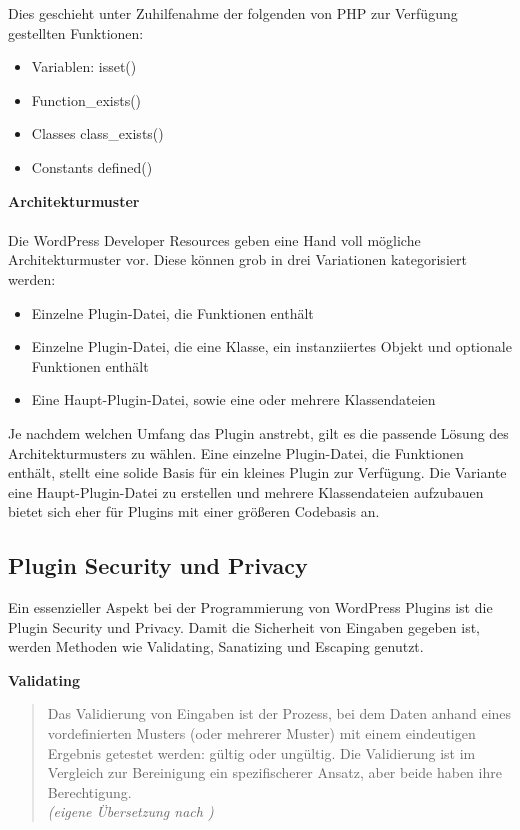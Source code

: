 Dies geschieht unter Zuhilfenahme der folgenden von PHP zur Verfügung gestellten Funktionen:
\begin{itemize}
 \item Variablen: isset()
 \item Function\_exists() %
 \item Classes class\_exists()
 \item Constants defined()
\end{itemize}
\vspace{1em}
\textbf{Architekturmuster}\\\\
Die WordPress Developer Resources geben eine Hand voll mögliche Architekturmuster vor.
Diese können grob in drei Variationen kategorisiert werden:
\begin{itemize}
 \item Einzelne Plugin-Datei, die Funktionen enthält
 \item Einzelne Plugin-Datei, die eine Klasse, ein instanziiertes Objekt und optionale Funktionen enthält
 \item Eine Haupt-Plugin-Datei, sowie eine oder mehrere Klassendateien
\end{itemize}

Je nachdem welchen Umfang das Plugin anstrebt, gilt es die passende Lösung des Architekturmusters zu wählen.
Eine einzelne Plugin-Datei, die Funktionen enthält, stellt eine solide Basis für ein kleines Plugin zur Verfügung.
Die Variante eine Haupt-Plugin-Datei zu erstellen und mehrere Klassendateien aufzubauen bietet sich eher für Plugins mit einer größeren Codebasis an.

\subsection{Plugin Security und Privacy}
Ein essenzieller Aspekt bei der Programmierung von WordPress Plugins ist die Plugin Security und Privacy.
Damit die Sicherheit von Eingaben gegeben ist, werden Methoden wie Validating, Sanatizing und Escaping genutzt.

\textbf{Validating}

\begin{quote}
 Das Validierung von Eingaben ist der Prozess, bei dem Daten anhand eines vordefinierten Musters (oder mehrerer Muster) mit einem eindeutigen Ergebnis getestet werden: gültig oder ungültig.
 Die Validierung ist im Vergleich zur Bereinigung ein spezifischerer Ansatz, aber beide haben ihre Berechtigung.
 \\[0.5em]
 \emph{(eigene Übersetzung nach \cite{wordpress2024plugin_validation})}
\end{quote}

